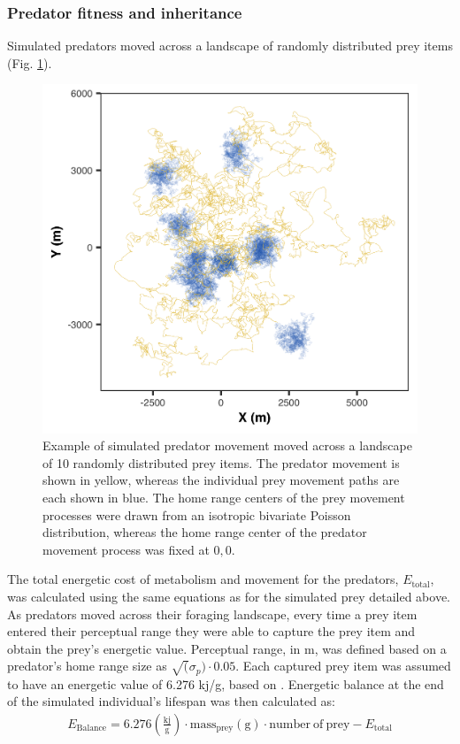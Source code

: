 \documentclass[12pt]{article}
\begin{document}
\subsubsection*{Predator fitness and inheritance}

Simulated predators moved across a landscape of randomly distributed prey items (Fig. \ref{fig:Pred_Example}).

\begin{figure}[!h]
\centering
\includegraphics[scale=1]{Sim_Example.png}
\caption{Example of simulated predator movement moved across a landscape of 10 randomly distributed prey items. The predator movement is shown in yellow, whereas the individual prey movement paths are each shown in blue. The home range centers of the prey movement processes were drawn from an isotropic bivariate Poisson distribution, whereas the home range center of the predator movement process was fixed at $0,0$.}
\label{fig:Pred_Example}
\end{figure}

The total energetic cost of metabolism and movement for the predators, $E_{\mathrm{total}}$, was calculated using the same equations as for the simulated prey detailed above. As predators moved across their foraging landscape, every time a prey item entered their perceptual range they were able to capture the prey item and obtain the prey's energetic value. Perceptual range, in m, was defined based on a predator's home range size as $\sqrt(\sigma_p)\cdot 0.05$. Each captured prey item was assumed to have an energetic value of 6.276 kj/g, based on \cite{Gorecki:1965}. Energetic balance at the end of the simulated individual's lifespan was then calculated as:
\begin{gather}
E_{\mathrm{Balance}} = 6.276 \mathrm{(\frac{kj}{g})} \cdot \mathrm{mass_{prey} (g) \cdot number~of~prey}  - E_{\mathrm{total}}
\end{gather}
\end{document}
